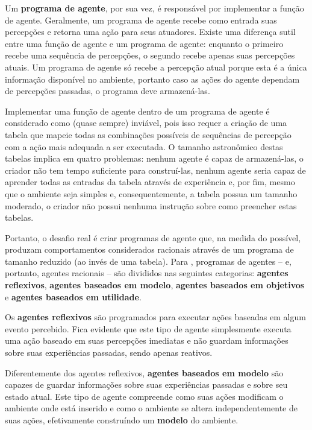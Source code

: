 Um \textbf{programa de agente}, por sua vez, é responsável por implementar a
função de agente. Geralmente, um programa de agente recebe como entrada suas
percepções e retorna uma ação para seus atuadores. Existe uma diferença sutil
entre uma função de agente e um programa de agente: enquanto o primeiro recebe
uma sequência de percepções, o segundo recebe apenas suas percepções atuais. Um
programa de agente só recebe a percepção atual porque esta é a única informação
disponível no ambiente, portanto caso as ações do agente dependam de percepções
passadas, o programa deve armazená-las.

Implementar uma função de agente dentro de um programa de agente é considerado
como (quase sempre) inviável, pois isso requer a criação de uma tabela que
mapeie todas as combinações possíveis de sequências de percepção com a ação mais
adequada a ser executada. O tamanho astronômico destas tabelas implica em quatro
problemas: nenhum agente é capaz de armazená-las, o criador não tem tempo
suficiente para construí-las, nenhum agente seria capaz de aprender todas as
entradas da tabela através de experiência e, por fim, mesmo que o ambiente seja
simples e, consequentemente, a tabela possua um tamanho moderado, o criador não
possui nenhuma instrução sobre como preencher estas tabelas.

Portanto, o desafio real é criar programas de agente que, na medida do possível,
produzam comportamentos considerados racionais através de um programa de tamanho
reduzido (ao invés de uma tabela). Para \cite{RussellNorvig200912}, programas de
agentes -- e, portanto, agentes racionais -- são divididos nas seguintes
categorias: \textbf{agentes reflexivos}, \textbf{agentes baseados em modelo},
\textbf{agentes baseados em objetivos} e \textbf{agentes baseados em utilidade}.

Os \textbf{agentes reflexivos} são programados para executar ações baseadas em
algum evento percebido. Fica evidente que este tipo de agente simplesmente
executa uma ação baseado em suas percepções imediatas e não guardam informações
sobre suas experiências passadas, sendo apenas reativos.

Diferentemente dos agentes reflexivos, \textbf{agentes baseados em modelo} são
capazes de guardar informações sobre suas experiências passadas e sobre seu
estado atual. Este tipo de agente compreende como suas ações modificam o
ambiente onde está inserido e como o ambiente se altera independentemente de
suas ações, efetivamente construíndo um \textbf{modelo} do ambiente. 


